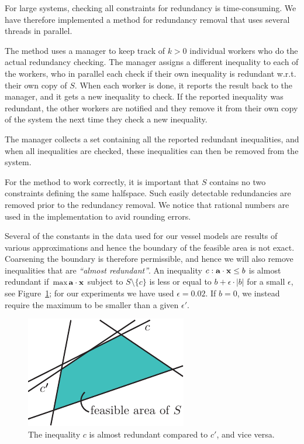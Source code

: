 For large systems, checking all constraints for redundancy is time-consuming. We have therefore implemented a method for redundancy removal that uses several threads in parallel. 

The method uses a manager to keep track of $k>0$ individual workers who do the actual redundancy checking.
The manager assigns a different inequality to each of the workers, who in parallel each check if their own inequality is redundant w.r.t. their own copy of $S$. When each worker is done, it reports the result back to the manager, and it gets a new inequality to check.  
If the reported inequality was redundant, the other workers are notified and they remove it from their own copy of the system the next time they check a new inequality. 

The manager collects a set containing all the reported redundant inequalities, and when all inequalities are checked, these inequalities can then be removed from the system.

For the method to work correctly, it is important that $S$ contains no two constraints defining the same halfspace. Such easily detectable redundancies are removed prior to the redundancy removal. We notice that rational numbers are used in the implementation to avid rounding errors. 

Several of the constants in the data used for our vessel models are results of various approximations and hence the boundary of the feasible area is not exact. Coarsening the boundary is therefore permissible, and hence we will also remove inequalities that are \emph{``almost redundant''}. An inequality $c: \mathbf{a}\cdot\mathbf{x}\leq b$ is almost redundant if $\max \mathbf{a}\cdot\mathbf{x}$  subject to $S\setminus\{c\}$ is less or equal to $b + \epsilon\cdot |b|$ for a small $\epsilon$, see Figure~\ref{fig:almostRedundant}; for our experiments we have used $\epsilon = 0.02$. If $b=0$, we instead require the maximum to be smaller than a given $\epsilon'$. 

\begin{figure}[htbp]
	\centering
		\includegraphics[scale=0.9]{figures/almostRedundant.pdf}
	\caption{The inequality $c$ is almost redundant compared to $c'$, and vice versa.}
	\label{fig:almostRedundant}
\end{figure}


